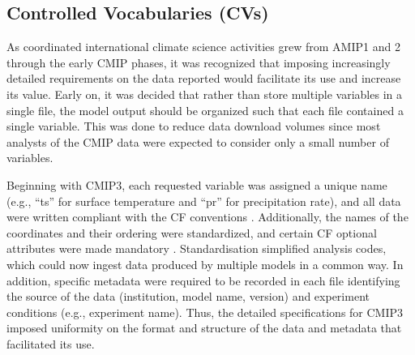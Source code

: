 \documentclass[manuscript]{copernicus}
\newcommand{\mycomment}[1]{}
\def\cred#1{{\color{red}#1}}
\begin{document}
\subsection{Controlled Vocabularies (CVs)}
\label{sec:CMIPCVs}
\mycomment{
\textbf{Attn: IPSL folks; MIP era realm evolution, dovetailing Variable request section}
Google docs yet to be finalized
CMIP6 global atts - https://docs.google.com/document/d/1h0r8RZr_f3-8egBMMh7aqLwy3snpD6_MrDz1q8n5XUk/edit
CMIP6 output metadata reqs - https://docs.google.com/document/d/1os9rZ11U0ajY7F8FWtgU4B49KcB59aFlBVGfLC4ahXs/edit
XML filenames/exps across eras - https://docs.google.com/document/d/1bUwK6G_fVZO53UjLZbQUOuBP47PsT8lqKKhL1pjRnKg/edit
CMIP5 standard output update - https://docs.google.com/document/d/1qOrdq6YOv8Tyx_NuqfKEw_EFBX_cvp8WTmRDzfuqn5s/edit
}

As coordinated international climate science activities grew from AMIP1 and 2 through the early CMIP phases, it was recognized that imposing increasingly detailed requirements on the data reported would facilitate its use and increase its value. Early on, it was decided that rather than store multiple variables in a single file, the model output should be organized such that each file contained a single variable. This was done to reduce data download volumes since most analysts of the CMIP data were expected to consider only a small number of variables.

Beginning with CMIP3, each requested variable was assigned a unique name (e.g., “ts” for surface temperature and “pr” for precipitation rate), and all data were written compliant with the CF conventions \citep[e.g.,][]{taylor_pcmdi_2009}. Additionally, the names of the coordinates and their ordering were standardized, and certain CF optional attributes were made mandatory \citep[e.g., "cell\_methods";][]{eaton_netcdf_2024}. Standardisation simplified analysis codes, which could now ingest data produced by multiple models in a common way. In addition, specific metadata were required to be recorded in each file identifying the source of the data (institution, model name, version) and experiment conditions (e.g., experiment name). Thus, the detailed specifications for CMIP3 \citep[see][]{taylor_pcmdi_2005} imposed uniformity on the format and structure of the data and metadata that facilitated its use.
\end{document}

